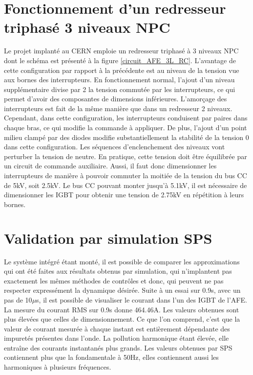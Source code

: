 \section{Fonctionnement d'un redresseur triphasé 3 niveaux NPC}
Le projet implanté au CERN emploie un redresseur triphasé à 3 niveaux NPC dont le schéma est présenté à la figure \ref{circuit_AFE_3L_RC}. L'avantage de cette configuration par rapport à la précédente est au niveau de la tension vue aux bornes des interrupteurs. En fonctionnement normal, l'ajout d'un niveau supplémentaire divise par 2 la tension commutée par les interrupteurs, ce qui permet d'avoir des composantes de dimensions inférieures. L'amorçage des interrupteurs est fait de la même manière que dans un redresseur 2 niveaux. Cependant, dans cette configuration, les interrupteurs conduisent par paires dans chaque bras, ce qui modifie la commande à appliquer. De plus, l'ajout d'un point milieu \og clampé \fg{} par des diodes modifie substantiellement la stabilité de la tension 0 dans cette configuration. Les séquences d'enclenchement des niveaux vont perturber la tension de neutre. En pratique, cette tension doit être équilibrée par un circuit de commande auxiliaire. Aussi, il faut donc dimensionner les interrupteurs de manière à pouvoir commuter la moitiée de la tension du bus CC de  5kV, soit 2.5kV. Le bus CC pouvant monter jusqu'à 5.1kV, il est nécessaire de dimensionner les IGBT pour obtenir une tension de 2.75kV en répétition à leurs bornes. 

\section{Validation par simulation SPS}
Le système intégré étant monté, il est possible de comparer les approximations qui ont été faites aux résultats obtenus par simulation, qui n'implantent pas exactement les mêmes méthodes de contrôles et donc, qui peuvent ne pas respecter expressément la dynamique désirée. Suite à un essai sur 0.9s, avec un pas de 10$\mu$s, il est possible de visualiser le courant dans l'un des IGBT de l'AFE. La mesure du courant RMS sur 0.9s donne 464.46A. Les valeurs obtenues sont plus élevées que celles de dimensionnement. Ce que l'on comprend, c'est que la valeur de courant mesurée à chaque instant est entièrement dépendante des impuretés présentes dans l'onde. La pollution harmonique étant élevée, elle entraîne des courants instantanés plus grands. Les valeurs obtenues par SPS contiennent plus que la fondamentale à 50Hz, elles contiennent aussi les harmoniques à plusieurs fréquences. 
 
 